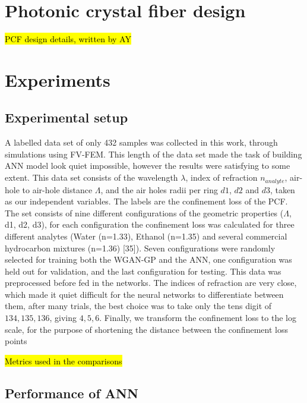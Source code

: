 \documentclass[draft, a4, 10pt, onecolumn]{IEEEtran}
\begin{document}
\section{Photonic crystal fiber design}
\label{sec:pcf}

\hl{PCF design details, written by AY}

\section{Experiments}
\label{sec:exp}

\subsection{Experimental setup}

A labelled data set of only 432 samples was collected in this work, through simulations using FV-FEM. This length of the data set made the task of building ANN model look quiet impossible, however the results were satisfying to some extent. This data set consists of the wavelength $\lambda$, index of refraction $n_{analyte} $, air-hole to air-hole distance $ \Lambda $, and the air holes radii per ring $d1$, $d2$ and $d3$, taken as our independent variables. The labels are the confinement loss of the PCF. The set consists of nine different configurations of the geometric properties ($ \Lambda $, d1, d2, d3), for each configuration the confinement loss was calculated for three different analytes (Water (n=1.33), Ethanol (n=1.35) and several commercial hydrocarbon mixtures (n=1.36) [35]). Seven configurations were randomly selected for training both the WGAN-GP and the ANN, one configuration was held out for validation, and the last configuration for testing. This data was preprocessed before fed in the networks. The indices of refraction  are very close, which made it quiet difficult for the neural networks to differentiate between them, after many trials, the best choice was to take only the tens digit of ${134, 135, 136}$, giving ${4, 5, 6}$. Finally, we transform the confinement loss to the log scale, for the purpose of shortening the distance between the confinement loss points

\hl{Metrics used in the comparisons}


\subsection{Performance of ANN}
\end{document}
